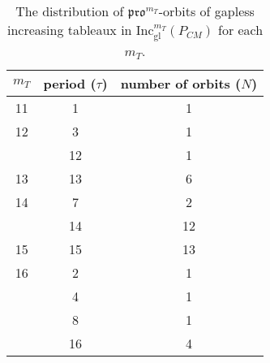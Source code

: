 \documentclass[12pt]{amsart}
\theoremstyle{definition}
\theoremstyle{remark}
\numberwithin{equation}{section}
\newcommand{\inc}{\ensuremath{\mathrm{Inc}}}
\newcommand{\incgl}{\inc_{\mathrm{gl}}}
\newcommand{\pro}{\mathfrak{pro}}
\begin{document}
\begin{table}[h]
\begin{tabular}{|c|c|c|}
\hline
${m_T}$ & period ($\tau$) & number of orbits ($N$)\\
  \hline
  11 & 1 & 1\\
  \hline
  12 & 3 & 1\\ \cline{2-3}
   & 12 & 1 \\
   \hline
  13 & 13 & 6\\
  \hline
  14 & 7 & 2\\\cline{2-3}
  & 14 & 12\\
  \hline
    15 & 15 & 13\\
  \hline
  16 & 2 & 1\\\cline{2-3}
   & 4 & 1\\\cline{2-3}
   & 8 & 1\\\cline{2-3}
  & 16 & 4\\
  \hline
\end{tabular}
\caption{The distribution of $\pro^{m_T}$-orbits of gapless increasing tableaux in $\incgl^{m_T}(P_{CM})$ for each ${m_T}$.}
\label{tab:E6}
\end{table}
\end{document}
